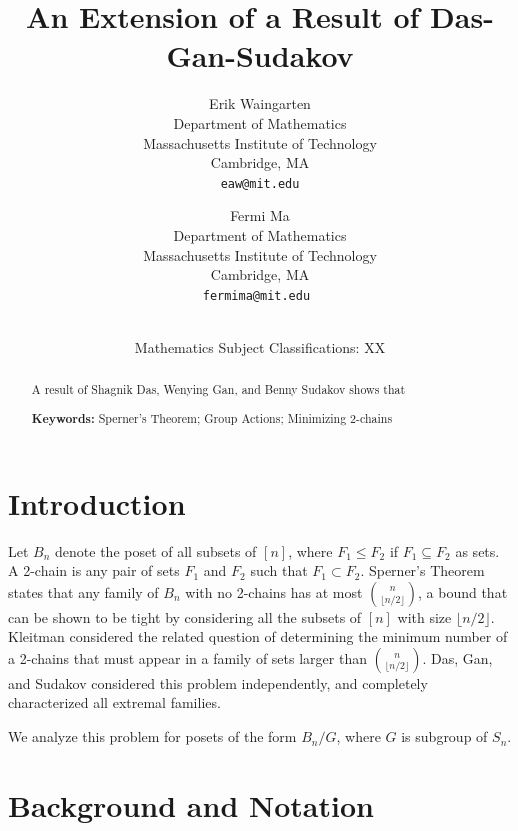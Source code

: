 \documentclass[12pt]{article}
\title{\bf An Extension of a Result of Das-Gan-Sudakov}
\author{Erik Waingarten\\
\small Department of Mathematics\\[-0.8ex]
\small Massachusetts Institute of Technology\\[-0.8ex] 
\small Cambridge, MA\\
\small\tt eaw@mit.edu\\
\and
Fermi Ma\\
\small Department of Mathematics\\[-0.8ex]
\small Massachusetts Institute of Technology\\[-0.8ex]
\small Cambridge, MA\\
\small\tt fermima@mit.edu
}
\date{\dateline{August, 2014}{XX}\\
\small Mathematics Subject Classifications: XX}
\theoremstyle{plain}
\theoremstyle{definition}
\theoremstyle{remark}
\begin{document}
\maketitle


\begin{abstract}
  A result of Shagnik Das, Wenying Gan, and Benny Sudakov shows that

  \bigskip\noindent \textbf{Keywords:} Sperner's Theorem; Group Actions; Minimizing 2-chains\end{abstract}

\section{Introduction}

Let $B_n$ denote the poset of all subsets of $[n]$, where $F_1 \leq F_2$ if $F_1 \subseteq F_2$ as sets. A 2-chain is any pair of sets $F_1$ and $F_2$ such that $F_1 \subset F_2$. Sperner's Theorem states that any family of $B_n$ with no 2-chains has at most $\binom{n}{\lfloor n/2 \rfloor}$, a bound that can be shown to be tight by considering all the subsets of $[n]$ with size $\lfloor n/2 \rfloor$. Kleitman considered the related question of determining the minimum number of a 2-chains that must appear in a family of sets larger than $\binom{n}{\lfloor n/2 \rfloor}$. Das, Gan, and Sudakov considered this problem independently, and completely characterized all extremal families.

We analyze this problem for posets of the form $B_n / G$, where $G$ is subgroup of $S_n$.


\section{Background and Notation}
\end{document}
